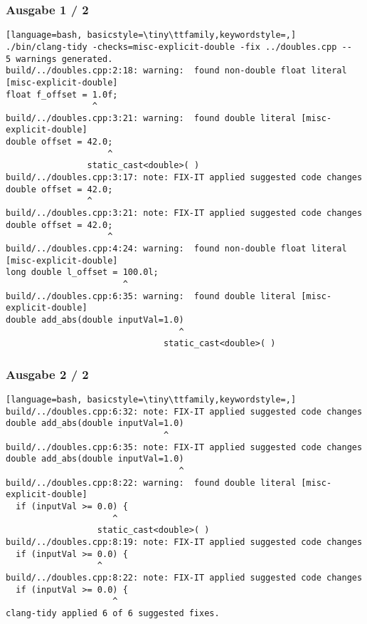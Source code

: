 \documentclass[aspectratio=169]{beamer}
\begin{document}
\begin{frame}[fragile]
  \frametitle{Ausgabe 1 / 2}
  \begin{lstlisting}[language=bash, basicstyle=\tiny\ttfamily,keywordstyle=,]
./bin/clang-tidy -checks=misc-explicit-double -fix ../doubles.cpp -- 
5 warnings generated.
build/../doubles.cpp:2:18: warning:  found non-double float literal [misc-explicit-double]
float f_offset = 1.0f;
                 ^
build/../doubles.cpp:3:21: warning:  found double literal [misc-explicit-double]
double offset = 42.0;
                    ^
                static_cast<double>( )
build/../doubles.cpp:3:17: note: FIX-IT applied suggested code changes
double offset = 42.0;
                ^
build/../doubles.cpp:3:21: note: FIX-IT applied suggested code changes
double offset = 42.0;
                    ^
build/../doubles.cpp:4:24: warning:  found non-double float literal [misc-explicit-double]
long double l_offset = 100.0l;
                       ^
build/../doubles.cpp:6:35: warning:  found double literal [misc-explicit-double]
double add_abs(double inputVal=1.0)
                                  ^
                               static_cast<double>( )
  \end{lstlisting}
\end{frame}
\begin{frame}[fragile]
  \frametitle{Ausgabe 2 / 2}
  \begin{lstlisting}[language=bash, basicstyle=\tiny\ttfamily,keywordstyle=,]
build/../doubles.cpp:6:32: note: FIX-IT applied suggested code changes
double add_abs(double inputVal=1.0)
                               ^
build/../doubles.cpp:6:35: note: FIX-IT applied suggested code changes
double add_abs(double inputVal=1.0)
                                  ^
build/../doubles.cpp:8:22: warning:  found double literal [misc-explicit-double]
  if (inputVal >= 0.0) {
                     ^
                  static_cast<double>( )
build/../doubles.cpp:8:19: note: FIX-IT applied suggested code changes
  if (inputVal >= 0.0) {
                  ^
build/../doubles.cpp:8:22: note: FIX-IT applied suggested code changes
  if (inputVal >= 0.0) {
                     ^
clang-tidy applied 6 of 6 suggested fixes.
  \end{lstlisting}
\end{frame}

\begin{frame}[fragile]
  \frametitle{Gefixted Beispiel}
  C++}, basicstyle=\small\ttfamily, keywordstyle=\color{blue}, emph={FIXME}, emphstyle=\color{red}]{doubles.cpp}
\end{frame}
\end{document}
